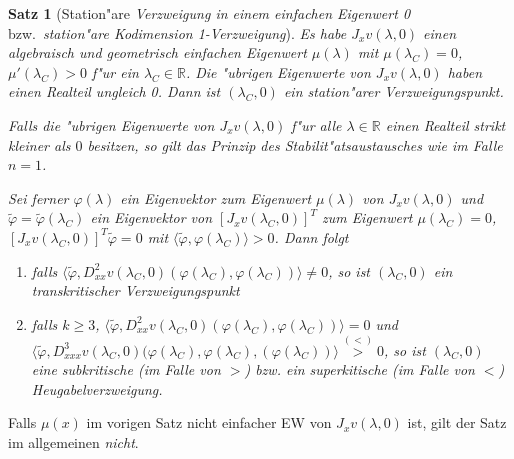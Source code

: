 \documentclass[a4paper, 13pt]{scrreprt}
\newtheorem{satz}{Satz}[section]
\theoremstyle{definition} \newtheorem{definition}{Definition}[section]
\newenvironment{bemerkung}[1][Bemerkung]{\begin{trivlist}
\item[\hskip \labelsep {\bfseries #1}]}{\end{trivlist}}
\newcommand{\RR}{\mathbb{R}}
\begin{document}
\begin{satz}[Station"are \emph{Verzweigung in einem einfachen Eigenwert 0} bzw.\ \emph{station"are \glqq Kodimension 1\grqq-Verzweigung}]
Es habe $J_xv(\lambda,0)$ einen algebraisch und geometrisch einfachen Eigenwert $\mu(\lambda)$ mit $\mu(\lambda_C) = 0$, $\mu'(\lambda_C) > 0$ f"ur ein $\lambda_C \in \RR$. Die "ubrigen Eigenwerte von $J_xv(\lambda,0)$ haben einen Realteil ungleich 0. Dann ist $(\lambda_C, 0)$ ein station"arer Verzweigungspunkt.

Falls die "ubrigen Eigenwerte von $J_xv(\lambda,0)$ f"ur alle $\lambda\in\RR$ einen Realteil strikt kleiner als $0$ besitzen, so gilt das \emph{Prinzip des Stabilit"atsaustausches} wie im Falle $n = 1$.

Sei ferner $\varphi(\lambda)$ ein Eigenvektor zum Eigenwert $\mu(\lambda)$ von $J_xv(\lambda,0)$ und $\tilde{\varphi} = \tilde{\varphi}(\lambda_C)$ ein Eigenvektor von $\left[J_xv(\lambda_C,0)\right]^T$ zum Eigenwert $\mu(\lambda_C) = 0$, $\left[J_xv(\lambda_C,0)\right]^T\tilde{\varphi} = 0$ mit $\langle\tilde{\varphi},\varphi(\lambda_C)\rangle > 0$. Dann folgt
\begin{enumerate}
\item falls
$\langle\tilde{\varphi},D_{xx}^2v(\lambda_C,0)(\varphi(\lambda_C),\varphi(\lambda_C))\rangle\neq 0$, so ist $(\lambda_C,0)$ ein transkritischer Verzweigungspunkt

\item falls $k\geq 3$, 
$\langle\tilde{\varphi},D_{xx}^2v(\lambda_C,0)(\varphi(\lambda_C),\varphi(\lambda_C))\rangle = 0$ und\\ $\langle\tilde{\varphi},D_{xxx}^3v(\lambda_C,0)(\varphi(\lambda_C),\varphi(\lambda_C),(\varphi(\lambda_C))\rangle\stackrel{(<)}{>}0$, so ist $(\lambda_C,0)$ eine subkritische (im Falle von \glqq$>$\grqq) bzw. ein superkitische (im Falle von \glqq$<$\grqq) Heugabelverzweigung.

\end{enumerate}
\end{satz}

\begin{bemerkung}
Falls $\mu(x)$ im vorigen Satz nicht einfacher EW von $J_xv(\lambda,0)$ ist, gilt der Satz im allgemeinen \emph{nicht}.
\end{bemerkung}
\end{document}
